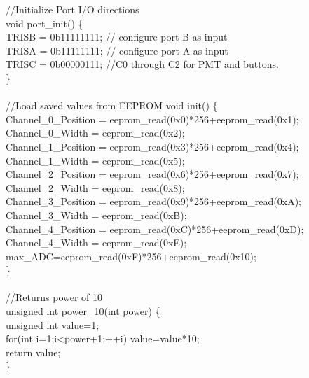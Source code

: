 //Initialize Port I/O directions\\
void port\_init() \{\\
\tabto*{.5cm}	TRISB = 0b11111111;  \tabto*{7.5cm} // configure port B as input\\
\tabto*{.5cm}	TRISA = 0b11111111;   \tabto*{7.5cm} // configure port A as input\\
\tabto*{.5cm}	TRISC = 0b00000111;  \tabto*{7.5cm} //C0 through C2 for PMT and buttons.  \\
\}\\\\
//Load saved values from EEPROM
void init() \{  \\
\tabto*{.5cm}	Channel\_0\_Position = eeprom\_read(0x0)*256+eeprom\_read(0x1);  \\   
\tabto*{.5cm}	Channel\_0\_Width = eeprom\_read(0x2);\\
\tabto*{.5cm}	Channel\_1\_Position = eeprom\_read(0x3)*256+eeprom\_read(0x4);  \\
\tabto*{.5cm}	Channel\_1\_Width = eeprom\_read(0x5);\\
\tabto*{.5cm}	Channel\_2\_Position = eeprom\_read(0x6)*256+eeprom\_read(0x7);    \\  
\tabto*{.5cm}	Channel\_2\_Width = eeprom\_read(0x8);\\
\tabto*{.5cm}	Channel\_3\_Position = eeprom\_read(0x9)*256+eeprom\_read(0xA);    \\  
\tabto*{.5cm}	Channel\_3\_Width = eeprom\_read(0xB);\\
\tabto*{.5cm}	Channel\_4\_Position = eeprom\_read(0xC)*256+eeprom\_read(0xD);      \\
\tabto*{.5cm}	Channel\_4\_Width = eeprom\_read(0xE);\\
\tabto*{.5cm}	max\_ADC=eeprom\_read(0xF)*256+eeprom\_read(0x10);  \\
\}\\
\\
//Returns power of 10\\
unsigned int power\_10(int power) \{  \\    
\tabto*{.5cm}	unsigned int value=1;\\
\tabto*{.5cm}	for(int i=1;i<power+1;++i) value=value*10;\\
\tabto*{.5cm}	return value;\\
\}\\
\\


